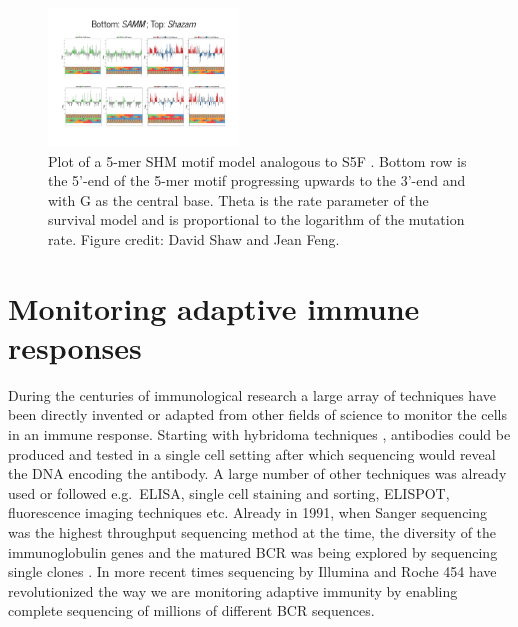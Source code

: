 \begin{figure}[!ht]
    \centering
    \includegraphics[width=0.45\textwidth]{figures/SAMM_plot.pdf}
    \caption{
        \label{fig:SAMM_plot}
        Plot of a 5-mer SHM motif model analogous to S5F \cite{cui2016model}. Bottom row is the 5'-end of the 5-mer motif progressing upwards to the 3'-end and with G as the central base. Theta is the rate parameter of the survival model and is proportional to the logarithm of the mutation rate.
        Figure credit: David Shaw and Jean Feng.
    }
\end{figure}










\section{Monitoring adaptive immune responses}
During the centuries of immunological research a large array of techniques have been directly invented or adapted from other fields of science to monitor the cells in an immune response.
Starting with hybridoma techniques \cite{larrick1989polymemse}, antibodies could be produced and tested in a single cell setting after which sequencing would reveal the DNA encoding the antibody.
A large number of other techniques was already used or followed e.g.\ ELISA, single cell staining and sorting, ELISPOT, fluorescence imaging techniques etc.
Already in 1991, when Sanger sequencing was the highest throughput sequencing method at the time, the diversity of the immunoglobulin genes and the matured BCR was being explored by sequencing single clones \cite{yamada1991preferential}.
In more recent times sequencing by Illumina and Roche 454 have revolutionized the way we are monitoring adaptive immunity by enabling complete sequencing of millions of different BCR sequences.



